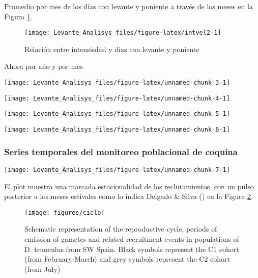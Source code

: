 \documentclass[
]{article}
\begin{document}
Promedio por mes de los días con levante y poniente a través de los meses en la Figura \ref{fig:intvel2}.

\begin{figure}

{\centering \texttt{[image: Levante\_Analisys\_files/figure-latex/intvel2-1]} 

}

\caption{Relación entre intensisdad y dias con levante y poniente}\label{fig:intvel2}
\end{figure}
\newpage

Ahora por año y por mes

\begin{center}\texttt{[image: Levante\_Analisys\_files/figure-latex/unnamed-chunk-3-1]} \end{center}

\begin{center}\texttt{[image: Levante\_Analisys\_files/figure-latex/unnamed-chunk-4-1]} \end{center}

\begin{center}\texttt{[image: Levante\_Analisys\_files/figure-latex/unnamed-chunk-5-1]} \end{center}

\begin{center}\texttt{[image: Levante\_Analisys\_files/figure-latex/unnamed-chunk-6-1]} \end{center}
\newpage

\subsubsection{Series temporales del monitoreo poblacional de coquina}\label{series-temporales-del-monitoreo-poblacional-de-coquina}

\begin{center}\texttt{[image: Levante\_Analisys\_files/figure-latex/unnamed-chunk-7-1]} \end{center}

El plot muestra una marcada estacionalidad de los reclutamientos, con un pulso posterior a los meses estivales como lo indica Delgado \& Silva () en la Figura \ref{fig:ciclo}.

\begin{figure}

{\centering \texttt{[image: figures/ciclo]} 

}

\caption{Schematic representation of the reproductive cycle, periods of emission of gametes and related recruitment events in populations of D. trunculus from SW Spain. Black symbols represent the C1 cohort (from February-March) and grey symbols represent the C2 cohort (from July)}\label{fig:ciclo}
\end{figure}
\newpage
\end{document}

